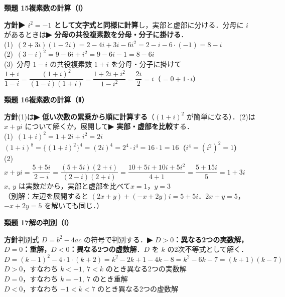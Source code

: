 \documentclass[a4paper,11pt]{ltjsarticle}
\newcommand{\ans}[2]{\Needspace{5\baselineskip}\vspace{6pt}%
  {\sffamily\bfseries 類題 #1\quad #2}\par}
\newcommand{\point}[1]{\textsf{\bfseries ▶ #1}}
\begin{document}
\ans{15}{複素数の計算（Ⅰ）}
\begin{kai}
\textbf{方針}\quad \point{$i^2=-1$ として文字式と同様に計算}し，実部と虚部に分ける．分母に $i$ があるときは\point{分母の共役複素数を分母・分子に掛ける}．\\[2pt]
(1)\ $(2+3i)(1-2i)=2-4i+3i-6i^2=2-i-6\cdot(-1)=8-i$\\[2pt]
(2)\ $(3-i)^2=9-6i+i^2=9-6i-1=8-6i$\\[2pt]
(3)\ 分母 $1-i$ の共役複素数 $1+i$ を分母・分子に掛けて\\
\hspace*{1.5em}$\dfrac{1+i}{1-i}=\dfrac{(1+i)^2}{(1-i)(1+i)}=\dfrac{1+2i+i^2}{1-i^2}=\dfrac{2i}{2}=i$\quad （$=0+1\cdot i$）
\end{kai}

\ans{16}{複素数の計算（Ⅱ）}
\begin{kai}
\textbf{方針}\quad (1)は\point{低い次数の累乗から順に計算する}（$(1+i)^2$ が簡単になる）．(2)は $x+yi$ について解くか，展開して\point{実部・虚部を比較}する．\\[2pt]
(1)\ $(1+i)^2=1+2i+i^2=2i$\\
\hspace*{1.5em}$(1+i)^8=\{(1+i)^2\}^4=(2i)^4=2^4\cdot i^4=16\cdot1=16$\quad （$i^4=(i^2)^2=1$）\\[2pt]
(2)\ $x+yi=\dfrac{5+5i}{2-i}=\dfrac{(5+5i)(2+i)}{(2-i)(2+i)}=\dfrac{10+5i+10i+5i^2}{4+1}=\dfrac{5+15i}{5}=1+3i$\\[2pt]
\hspace*{1.5em}$x,\ y$ は実数だから，実部と虚部を比べて\quad $x=1$，$y=3$\\
\hspace*{1.5em}（別解：左辺を展開すると $(2x+y)+(-x+2y)i=5+5i$．$2x+y=5$，$-x+2y=5$ を解いても同じ．）
\end{kai}

\ans{17}{解の判別（Ⅰ）}
\begin{kai}
\textbf{方針}\quad 判別式 $D=b^2-4ac$ の符号で判別する．\point{$D>0$：異なる2つの実数解，$D=0$：重解，$D<0$：異なる2つの虚数解}．$D$ を $k$ の2次不等式として解く．\\[2pt]
$D=(k-1)^2-4\cdot1\cdot(k+2)=k^2-2k+1-4k-8=k^2-6k-7=(k+1)(k-7)$\\[2pt]
$D>0$，すなわち $k<-1,\ 7<k$ のとき\quad 異なる2つの実数解\\
$D=0$，すなわち $k=-1,\ 7$ のとき\quad 重解\\
$D<0$，すなわち $-1<k<7$ のとき\quad 異なる2つの虚数解
\end{kai}
\end{document}
